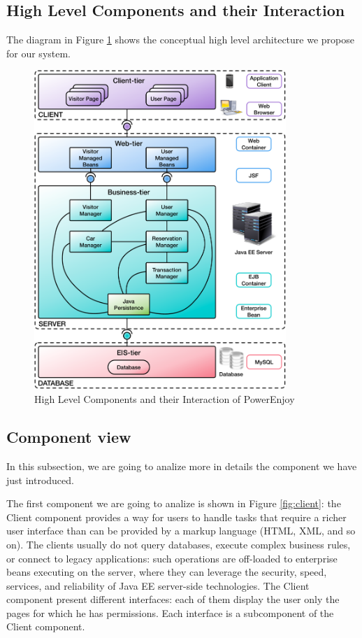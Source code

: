\subsection{High Level Components and their Interaction} \label{subsec:comp-inter}

The diagram in Figure \ref{fig:high-comp} shows the conceptual high level architecture we propose for our system.
\vspace{18pt}
\begin{figure}[htbp]
\centering
\includegraphics[width=0.85\textwidth]{Images/HighLevelComponents.pdf}
\vspace{10pt}
\caption{High Level Components and their Interaction of PowerEnjoy}
\label{fig:high-comp}
\end{figure}
\clearpage

\subsection{Component view} \label{subsec:comp-view}
In this subsection, we are going to analize more in details the component we have just introduced.

\newline
The first component we are going to analize is shown in Figure \ref{fig:client}: the Client component provides a way for users to handle tasks that require a richer user interface than can be provided by a markup language (HTML, XML, and so on).
The clients usually do not query databases, execute complex business rules, or connect to legacy applications: such operations are off-loaded to enterprise beans executing on the server, where they can leverage the security, speed, services, and reliability of Java EE server-side technologies.
The Client component present different interfaces: each of them display the user only the pages for which he has permissions. 
Each interface is a subcomponent of the Client component.

